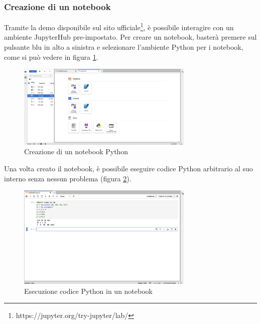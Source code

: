 \subsubsection{Creazione di un notebook}
Tramite la demo disponibile sul sito ufficiale\footnote{https://jupyter.org/try-jupyter/lab/}, è possibile interagire con un ambiente JupyterHub pre-impostato.
\newline
Per creare un notebook, basterà premere sul pulsante blu in alto a sinistra e selezionare l'ambiente Python per i notebook, come si può vedere in figura \ref{fig:jupyter-interface-2}.
\begin{figure}[h]
    \centering
    \includegraphics[width=0.75\textwidth]{images/jupyter-hub-2.png}
    \caption{Creazione di un notebook Python}
    \label{fig:jupyter-interface-2}
\end{figure}
\newline
Una volta creato il notebook, è possibile eseguire codice Python arbitrario al suo interno senza nessun problema (figura \ref{fig:jupyter-interface-3}).
\begin{figure}[h]
    \centering
    \includegraphics[width=0.75\textwidth]{images/jupyter-hub-3.png}
    \caption{Esecuzione codice Python in un notebook}
    \label{fig:jupyter-interface-3}
\end{figure}
\newpage
